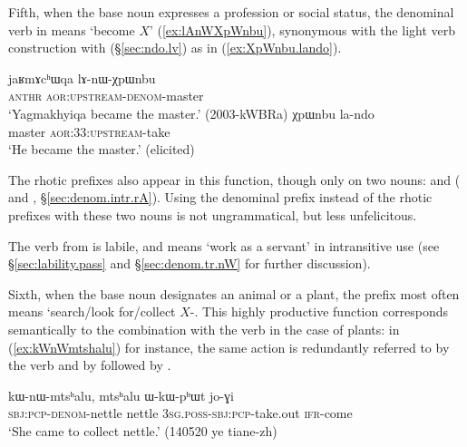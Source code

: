  Fifth, when the base noun expresses a profession or social status, the denominal verb in  means `become $X$' (\ref{ex:lAnWXpWnbu}), synonymous with the light verb construction with  (§\ref{sec:ndo.lv}) as in (\ref{ex:XpWnbu.lando}). 
  
 \begin{exe}
\ex 
 \begin{xlist}
 \ex \label{ex:lAnWXpWnbu}
\gll jaʁmɤcʰɯqa lɤ-nɯ-χpɯnbu  \\
\textsc{anthr} \textsc{aor}:\textsc{upstream}-\textsc{denom}-master \\
\glt `Yagmakhyiqa became the master.' (2003-kWBRa)
 \ex \label{ex:XpWnbu.lando}
\gll χpɯnbu la-ndo \\
 master \textsc{aor}:3\fl{}3:\textsc{upstream}-take \\
\glt `He became the master.' (elicited)
\end{xlist}
\end{exe}

The rhotic prefixes also appear in this function, though only on two nouns:  and  ( and , §\ref{sec:denom.intr.rA}). Using the  denominal prefix instead of the rhotic prefixes with these two nouns is not ungrammatical, but less unfelicitous.

The verb  from   is labile, and means `work as a servant' in intransitive use (see §\ref{sec:lability.pass}  and §\ref{sec:denom.tr.nW} for further discussion).
  
 Sixth, when the base noun designates an animal or a plant, the  prefix most often means `search/look for/collect $X$-. This highly productive function corresponds semantically to the combination with the verb  in the case of plants: in (\ref{ex:kWnWmtshalu}) for instance, the same action is redundantly referred to by the verb  and by  followed by .
 
 \begin{exe}
\ex \label{ex:kWnWmtshalu}
\gll  kɯ-nɯ-mtsʰalu, mtsʰalu ɯ-kɯ-pʰɯt jo-ɣi   \\
\textsc{sbj}:\textsc{pcp}-\textsc{denom}-nettle nettle \textsc{3sg}.\textsc{poss}-\textsc{sbj}:\textsc{pcp}-take.out \textsc{ifr}-come \\
\glt `She came to collect nettle.' (140520 ye tiane-zh) 
\end{exe}
 
